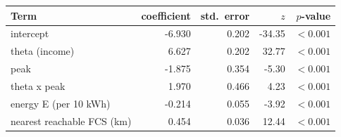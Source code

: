 \begin{tabular}{@{}lrrrr@{}}
\toprule
Term & coefficient & std.\ error & $z$ & $p$-value \\
\midrule
intercept & -6.930 & 0.202 & -34.35 & $<0.001$ \\
theta (income) & 6.627 & 0.202 & 32.77 & $<0.001$ \\
peak & -1.875 & 0.354 & -5.30 & $<0.001$ \\
theta x peak & 1.970 & 0.466 & 4.23 & $<0.001$ \\
energy E (per 10 kWh) & -0.214 & 0.055 & -3.92 & $<0.001$ \\
nearest reachable FCS (km) & 0.454 & 0.036 & 12.44 & $<0.001$ \\
\bottomrule
\end{tabular}
